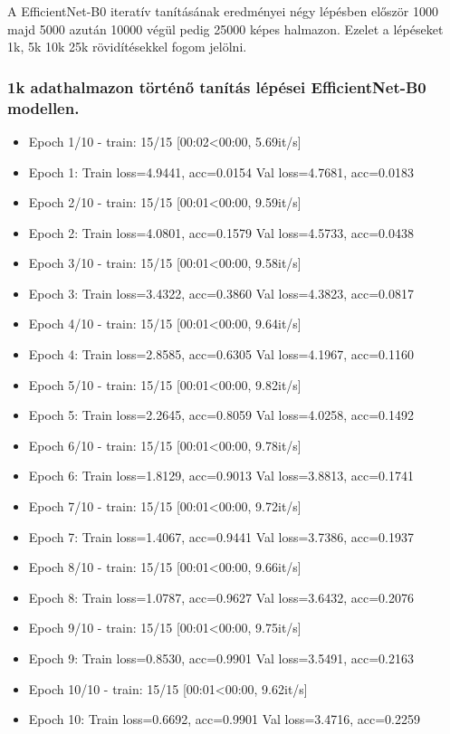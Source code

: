A EfficientNet-B0 iteratív tanításának eredményei négy lépésben először 1000 majd 5000 azután 10000 végül pedig 25000 képes halmazon. Ezelet a lépéseket 1k, 5k 10k 25k rövidítésekkel fogom jelölni.

\subsubsection{1k adathalmazon történő tanítás lépései EfficientNet-B0 modellen.}
  \begin{itemize} 
    \item Epoch 1/10 - train: 15/15 [00:02<00:00, 5.69it/s]
    \item Epoch 1: Train loss=4.9441, acc=0.0154 Val loss=4.7681, acc=0.0183
    \item Epoch 2/10 - train: 15/15 [00:01<00:00, 9.59it/s]
    \item Epoch 2: Train loss=4.0801, acc=0.1579 Val loss=4.5733, acc=0.0438
    \item Epoch 3/10 - train: 15/15 [00:01<00:00, 9.58it/s]
    \item Epoch 3: Train loss=3.4322, acc=0.3860 Val loss=4.3823, acc=0.0817
    \item Epoch 4/10 - train: 15/15 [00:01<00:00, 9.64it/s]
    \item Epoch 4: Train loss=2.8585, acc=0.6305 Val loss=4.1967, acc=0.1160
    \item Epoch 5/10 - train: 15/15 [00:01<00:00, 9.82it/s]
    \item Epoch 5: Train loss=2.2645, acc=0.8059 Val loss=4.0258, acc=0.1492
    \item Epoch 6/10 - train: 15/15 [00:01<00:00, 9.78it/s]
    \item Epoch 6: Train loss=1.8129, acc=0.9013 Val loss=3.8813, acc=0.1741
    \item Epoch 7/10 - train: 15/15 [00:01<00:00, 9.72it/s]
    \item Epoch 7: Train loss=1.4067, acc=0.9441 Val loss=3.7386, acc=0.1937
    \item Epoch 8/10 - train: 15/15 [00:01<00:00, 9.66it/s]
    \item Epoch 8: Train loss=1.0787, acc=0.9627 Val loss=3.6432, acc=0.2076
    \item Epoch 9/10 - train: 15/15 [00:01<00:00, 9.75it/s]
    \item Epoch 9: Train loss=0.8530, acc=0.9901 Val loss=3.5491, acc=0.2163
    \item Epoch 10/10 - train: 15/15 [00:01<00:00, 9.62it/s]
    \item Epoch 10: Train loss=0.6692, acc=0.9901 Val loss=3.4716, acc=0.2259
  \end{itemize}

